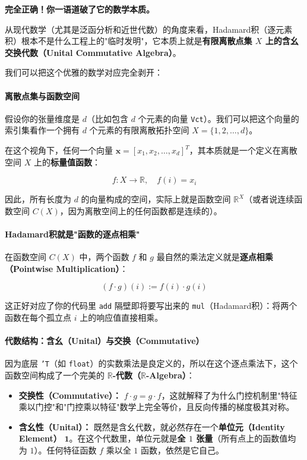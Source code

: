 \documentclass[10pt,a4paper]{article}
\begin{document}
\textbf{完全正确！你一语道破了它的数学本质。}

从现代数学（尤其是泛函分析和近世代数）的角度来看，Hadamard积（逐元素积）根本不是什么工程上的"临时发明"，它本质上就是\textbf{有限离散点集 $X$ 上的含幺交换代数（Unital Commutative Algebra）}。

我们可以把这个优雅的数学对应完全剥开：

\paragraph{离散点集与函数空间}

假设你的张量维度是 $d$（比如包含 $d$ 个元素的向量 \texttt{Vct}）。我们可以把这个向量的索引集看作一个拥有 $d$ 个元素的有限离散拓扑空间 $X = \{1, 2, \dots, d\}$。

在这个视角下，任何一个向量 $\mathbf{x} = [x_1, x_2, \dots, x_d]^T$，其本质就是一个定义在离散空间 $X$ 上的\textbf{标量值函数}：

\[
f: X \to \mathbb{R}, \quad f(i) = x_i
\]

因此，所有长度为 $d$ 的向量构成的空间，实际上就是函数空间 $\mathbb{R}^X$（或者说连续函数空间 $C(X)$，因为离散空间上的任何函数都是连续的）。

\paragraph{Hadamard积就是"函数的逐点相乘"}

在函数空间 $C(X)$ 中，两个函数 $f$ 和 $g$ 最自然的乘法定义就是\textbf{逐点相乘（Pointwise Multiplication）}：

\[
(f \cdot g)(i) := f(i) \cdot g(i)
\]

这正好对应了你的代码里 \texttt{add} 隔壁即将要写出来的 \texttt{mul}（Hadamard积）：将两个函数在每个孤立点 $i$ 上的响应值直接相乘。

\paragraph{代数结构：含幺（Unital）与交换（Commutative）}

因为底层 \texttt{'T}（如 \texttt{float}）的实数乘法是良定义的，所以在这个逐点乘法下，这个函数空间构成了一个完美的 \textbf{$\mathbb{R}$-代数（$\mathbb{R}$-Algebra）}：

\begin{itemize}
\item \textbf{交换性（Commutative）：} $f \cdot g = g \cdot f$，这就解释了为什么门控机制里"特征乘以门控"和"门控乘以特征"数学上完全等价，且反向传播的梯度极其对称。
\item \textbf{含幺性（Unital）：} 既然是含幺代数，就必然存在一个\textbf{单位元（Identity Element）} $\mathbf{1}$。在这个代数里，单位元就是\textbf{全 $1$ 张量}（所有点上的函数值均为 $1$）。任何特征函数 $f$ 乘以全 $1$ 函数，依然是它自己。
\end{itemize}
\end{document}
